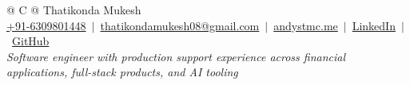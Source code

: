 \documentclass[10pt,a4paper]{article}
\begin{document}
\pagestyle{empty}


\begin{tabularx}{\linewidth}{@{} C @{}}
\Huge{Thatikonda Mukesh}\\[4pt]
\small
\href{tel:+91-6309801448}{+91-6309801448}\ $|$\
\href{mailto:thatikondamukesh08@gmail.com}{thatikondamukesh08@gmail.com}\ $|$\
\href{https://andystmc.me}{andystmc.me}\ $|$\
\href{https://www.linkedin.com/in/andystmc/}{LinkedIn}\ $|$\
\href{https://github.com/andystmc}{GitHub}\\[3pt]
\normalsize
\textit{Software engineer with production support experience across financial applications, full-stack products, and AI tooling}
\end{tabularx}

\end{document}
